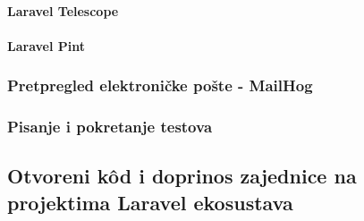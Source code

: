 \paragraph{Laravel Telescope}

\paragraph{Laravel Pint}

\subsubsection{Pretpregled elektroničke pošte - MailHog}

\subsubsection{Pisanje i pokretanje testova}

\subsection{Otvoreni k\^od i doprinos zajednice na projektima Laravel ekosustava}
